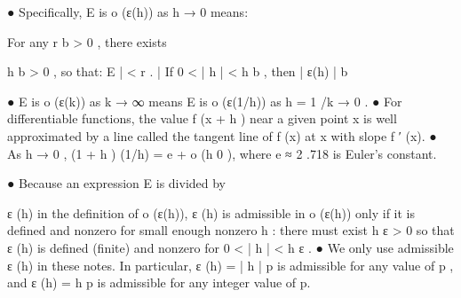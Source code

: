 ●
Specifically,  E    is  o (ε(h))  as  h → 0  means:  
 
For any  r b > 0 ,  there exists 
 
h b > 0 ,  so that:   
E | < r .  
|
 If  0 < | h | < h b ,  then  | ε(h)
| b
 
● E  is 
  o (ε(k))    as  k → ∞   means  E is 
  o (ε(1/h))  as  h = 1 /k → 0 .  
● For differentiable functions, the value  f (x + h )  near a given point  x is well  
approximated by a line called the tangent line of  f (x)  at  x with slope  f ′ (x).    
● As  h → 0 ,   (1 + h ) (1/h) = e + o (h 0 ),  where  e ≈ 2 .718  is Euler’s constant.
 
 
● Because an expression  E  is divided by 
 
ε (h) in the definition of  o (ε(h)),   ε (h)  is  
admissible in  o (ε(h))  only if it is defined and nonzero for small enough nonzero  
h :  there must exist  h ε > 0  so that  ε (h)  is defined (finite) and nonzero for  
0 < | h | < h ε .     
●  We only use admissible   ε (h)  in these notes.  In particular,  ε (h) = | h | p  is  
admissible for any value of  p ,  and   ε (h) = h p  is admissible for any integer value of  
p.
